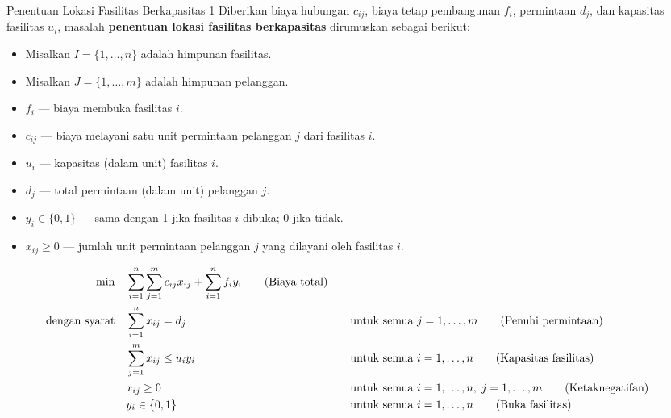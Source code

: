 \begin{general}{Penentuan Lokasi Fasilitas Berkapasitas 1}{\npcomplete}
Diberikan biaya hubungan \( c_{ij} \), biaya tetap pembangunan \( f_i \), permintaan \( d_j \), dan kapasitas fasilitas \( u_i \), masalah \textbf{penentuan lokasi fasilitas berkapasitas} dirumuskan sebagai berikut:

\begin{itemize}
\item Misalkan \( I = \{1,\dots, n\} \) adalah himpunan fasilitas.
\item Misalkan \( J = \{1, \dots, m\} \) adalah himpunan pelanggan.
\end{itemize}

\begin{itemize}
\item \( f_i \) — biaya membuka fasilitas \( i \).
\item \( c_{ij} \) — biaya melayani satu unit permintaan pelanggan \( j \) dari fasilitas \( i \).
\item \( u_i \) — kapasitas (dalam unit) fasilitas \( i \).
\item \( d_j \) — total permintaan (dalam unit) pelanggan \( j \).
\end{itemize}

\begin{itemize}
\item \( y_i \in \{0,1\} \) — sama dengan 1 jika fasilitas \( i \) dibuka; 0 jika tidak.
\item \( x_{ij} \geq 0 \) — jumlah unit permintaan pelanggan \( j \) yang dilayani oleh fasilitas \( i \).
\end{itemize}

\begin{align}
\min \quad & \sum_{i=1}^n \sum_{j=1}^m c_{ij} x_{ij} + \sum_{i=1}^n f_i y_i   \tag{Biaya total} \\
\mbox{dengan syarat}\quad        & \sum_{i=1}^n x_{ij} = d_j &&\quad \mbox{untuk semua } j = 1,\dots,m   \tag{Penuhi permintaan} \\
& \sum_{j=1}^m x_{ij} \leq u_i y_i &&\quad \mbox{untuk semua } i = 1,\dots,n   \tag{Kapasitas fasilitas} \\
& x_{ij} \geq 0 &&\quad \mbox{untuk semua } i = 1,\dots,n,\; j = 1,\dots,m   \tag{Ketaknegatifan} \\
& y_i \in \{0,1\} &&\quad \mbox{untuk semua } i = 1,\dots,n   \tag{Buka fasilitas}
\end{align}

\end{general}


